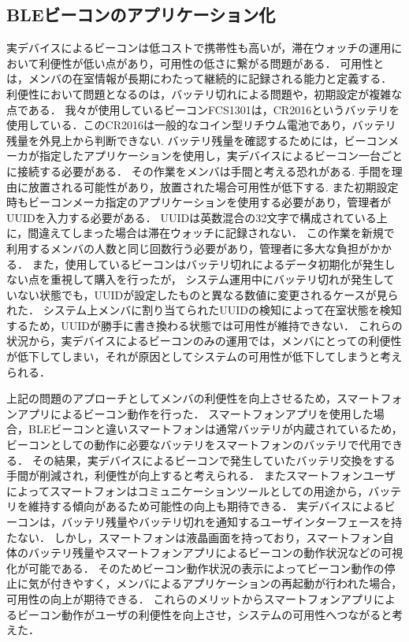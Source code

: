 \subsection{ BLEビーコンのアプリケーション化}
実デバイスによるビーコンは低コストで携帯性も高いが，滞在ウォッチの運用において利便性が低い点があり，可用性の低さに繋がる問題がある．
可用性とは，メンバの在室情報が長期にわたって継続的に記録される能力と定義する．  
利便性において問題となるのは，バッテリ切れによる問題や，初期設定が複雑な点である．
我々が使用しているビーコンFCS1301は，CR2016というバッテリを使用している．このCR2016は一般的なコイン型リチウム電池であり，バッテリ残量を外見上から判断できない.
バッテリ残量を確認するためには，ビーコンメーカが指定したアプリケーションを使用し，実デバイスによるビーコン一台ごとに接続する必要がある．
その作業をメンバは手間と考える恐れがある.
手間を理由に放置される可能性があり，放置された場合可用性が低下する.
また初期設定時もビーコンメーカ指定のアプリケーションを使用する必要があり，管理者がUUIDを入力する必要がある．
UUIDは英数混合の32文字で構成されている上に，間違えてしまった場合は滞在ウォッチに記録されない．
この作業を新規で利用するメンバの人数と同じ回数行う必要があり，管理者に多大な負担がかかる．
また，使用しているビーコンはバッテリ切れによるデータ初期化が発生しない点を重視して購入を行ったが，
システム運用中にバッテリ切れが発生していない状態でも，UUIDが設定したものと異なる数値に変更されるケースが見られた．
システム上メンバに割り当てられたUUIDの検知によって在室状態を検知するため，UUIDが勝手に書き換わる状態では可用性が維持できない．
これらの状況から，実デバイスによるビーコンのみの運用では，メンバにとっての利便性が低下してしまい，それが原因としてシステムの可用性が低下してしまうと考えられる．

上記の問題のアプローチとしてメンバの利便性を向上させるため，スマートフォンアプリによるビーコン動作を行った．
スマートフォンアプリを使用した場合，BLEビーコンと違いスマートフォンは通常バッテリが内蔵されているため，ビーコンとしての動作に必要なバッテリをスマートフォンのバッテリで代用できる．
その結果，実デバイスによるビーコンで発生していたバッテリ交換をする手間が削減され，利便性が向上すると考えられる．
またスマートフォンユーザによってスマートフォンはコミュニケーションツールとしての用途から，バッテリを維持する傾向があるため可能性の向上も期待できる．
実デバイスによるビーコンは，バッテリ残量やバッテリ切れを通知するユーザインターフェースを持たない．
しかし，スマートフォンは液晶画面を持っており，スマートフォン自体のバッテリ残量やスマートフォンアプリによるビーコンの動作状況などの可視化が可能である．
そのためビーコン動作状況の表示によってビーコン動作の停止に気が付きやすく，メンバによるアプリケーションの再起動が行われた場合，可用性の向上が期待できる．
これらのメリットからスマートフォンアプリによるビーコン動作がユーザの利便性を向上させ，システムの可用性へつながると考えた．


